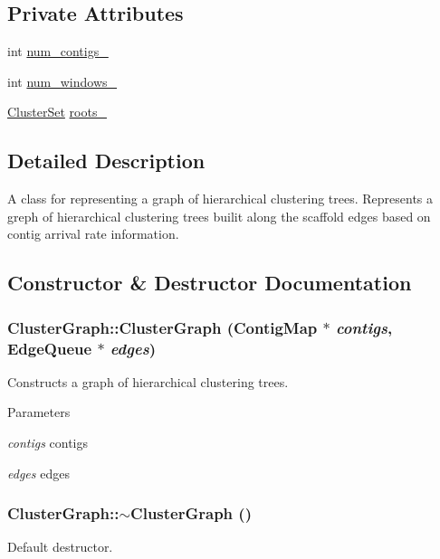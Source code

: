 \subsection*{Private Attributes}
\begin{DoxyCompactItemize}
\item 
int \hyperlink{classClusterGraph_a9d5062c556485d3ca77c2fc270ef1938}{num\_\-contigs\_\-}
\item 
int \hyperlink{classClusterGraph_ae52fec62b35dad39bd1cb757a2ff7add}{num\_\-windows\_\-}
\item 
\hyperlink{cluster_8h_ac282f47ef6416737ea8a6f13a61bfd86}{ClusterSet} \hyperlink{classClusterGraph_abbf63d74cafd0b69804e3ce316efa784}{roots\_\-}
\end{DoxyCompactItemize}


\subsection{Detailed Description}
A class for representing a graph of hierarchical clustering trees. Represents a greph of hierarchical clustering trees builit along the scaffold edges based on contig arrival rate information. 

\subsection{Constructor \& Destructor Documentation}
\hypertarget{classClusterGraph_a5148b43897abe7a6d5d54b52e8bd4a9b}{
\subsubsection[{ClusterGraph}]{\setlength{\rightskip}{0pt plus 5cm}ClusterGraph::ClusterGraph ({\bf ContigMap} $\ast$ {\em contigs}, \/  {\bf EdgeQueue} $\ast$ {\em edges})}}
\label{classClusterGraph_a5148b43897abe7a6d5d54b52e8bd4a9b}


Constructs a graph of hierarchical clustering trees. 
\begin{DoxyParams}{Parameters}
\item[{\em contigs}]contigs \item[{\em edges}]edges \end{DoxyParams}
\hypertarget{classClusterGraph_abe7d21fd3e9e14d61ed071b0def25995}{
\subsubsection[{$\sim$ClusterGraph}]{\setlength{\rightskip}{0pt plus 5cm}ClusterGraph::$\sim$ClusterGraph ()}}
\label{classClusterGraph_abe7d21fd3e9e14d61ed071b0def25995}
Default destructor. 

